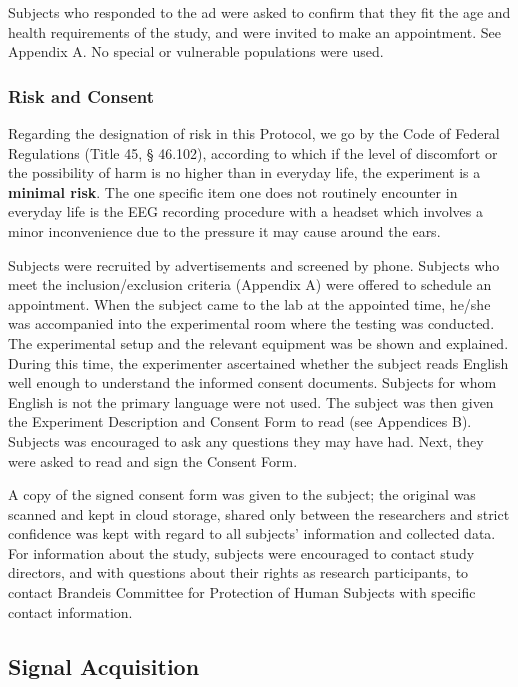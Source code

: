 \documentclass[journal]{IEEEtran}
\begin{document}
\vspace{5mm}
\normalsize Subjects who responded to the ad were asked to confirm that they fit the age and health requirements of the study, and were invited to make an appointment. See Appendix A. No special or vulnerable populations were used.

\subsubsection{Risk and Consent}
Regarding the designation of risk in this Protocol, we go by the Code of Federal Regulations (Title 45, § 46.102), according to which if the level of discomfort or the possibility of harm is no higher than in everyday life, the experiment is a \textbf{minimal risk}. The one specific item one does not routinely encounter in everyday life is the EEG recording procedure with a headset which involves a minor inconvenience due to the pressure it may cause around the ears. \par
Subjects were recruited by advertisements and screened by phone. Subjects who meet the inclusion/exclusion criteria (Appendix A) were offered to schedule an appointment. When the subject came to the lab at the appointed time, he/she was accompanied into the experimental room where the testing was conducted. The experimental setup and the relevant equipment was be shown and explained. During this time, the experimenter ascertained whether the subject reads English well enough to understand the informed consent documents. Subjects for whom English is not the primary language were not used. The subject was then given the Experiment Description and Consent Form to read (see Appendices B). Subjects was encouraged to ask any questions they may have had.  Next, they were asked to read and sign the Consent Form. \par  A copy of the signed consent form was given to the subject; the original was scanned and kept in cloud storage, shared only between the researchers and strict confidence was kept with regard to all subjects’ information and collected data.
For information about the study, subjects were encouraged to contact study directors, and with questions about their rights as research participants, to contact Brandeis Committee for Protection of Human Subjects with specific contact information.   

\subsection{Signal Acquisition}
\end{document}
